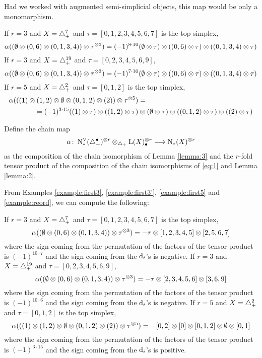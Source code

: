 \begin{remark}
	Had we worked with augmented semi-simplicial objects, this map would be only a monomorphism.
\end{remark}
\begin{example}\label{example:reord} If $r=3$ and $X=\triangle_{+}^7$ and $\tau = [0,1,2,3,4,5,6,7]$ is the top simplex,
\[
		\alpha((\emptyset \otimes  (0,6) \otimes  (0,1,3,4)) \otimes  \tau^{ \otimes  3}) = (-1)^{8\cdot 10}(\emptyset \otimes  \tau) \otimes  ((0,6) \otimes  \tau) \otimes  ((0,1,3,4) \otimes  \tau)
	\]
 If $r=3$ and $X=\triangle_{+}^{19}$ and $\tau = [0,2,3,4,5,6,9]$,
\[
		\alpha((\emptyset \otimes  (0,6) \otimes  (0,1,3,4)) \otimes  \tau^{ \otimes  3}) = (-1)^{7\cdot 10}(\emptyset \otimes  \tau) \otimes  ((0,6) \otimes  \tau) \otimes  ((0,1,3,4) \otimes  \tau)
	\]
 If $r=5$ and $X=\triangle_{+}^2$ and $\tau = [0,1,2]$ is the top simplex,
	\[
	\begin{split}
		\alpha(((1) \otimes  (1,2) \otimes  \emptyset \otimes  (0,1,2) \otimes  (2)) \otimes  \tau^{ \otimes  5}) &=
		\\
		=(-1)^{3\cdot 15}((1) \otimes  \tau)  \otimes  ((1,2) \otimes  \tau)& \otimes  (\emptyset \otimes  \tau) \otimes  ((0,1,2) \otimes  \tau) \otimes  ((2) \otimes  \tau)
		\end{split}
	\]
	\end{example}

\begin{definition} Define the chain map
	\[\alpha \colon  \operatorname{N}^\vee_{*}(\triangle_{+}^\bullet)^{ \otimes  r} \otimes _{\triangle_{+}} \operatorname{L}(X)_\bullet^{ \otimes  r}\longrightarrow \operatorname{N}_{*}(X)^{ \otimes  r}\]
as the composition of the chain isomorphism of Lemma \ref{lemma:3} and the $r$-fold tensor product of the composition of the chain isomorphisms of \eqref{eq:1} and Lemma \ref{lemma:2}.
\end{definition}


From Examples \ref{example:first3}, \ref{example:first3'}, \ref{example:first5} and \ref{example:reord}, we can compute the following:
\begin{example}\label{example:alpha} If $r=3$ and $X=\triangle_{+}^7$ and $\tau = [0,1,2,3,4,5,6,7]$ is the top simplex,
\[
		\alpha((\emptyset \otimes  (0,6) \otimes  (0,1,3,4)) \otimes  \tau^{ \otimes  3}) = -\tau \otimes  [1,2,3,4,5] \otimes  [2,5,6,7]
	\]
	where the sign coming from the permutation of the factors of the tensor product is $(-1)^{10\cdot 7}$ and the sign coming from the $\operatorname{d}_i$'s is negative. If $r=3$ and $X=\triangle_{+}^{19}$ and $\tau = [0,2,3,4,5,6,9]$,
\[
		\alpha((\emptyset \otimes  (0,6) \otimes  (0,1,3,4)) \otimes  \tau^{ \otimes  3}) = -\tau \otimes  [2,3,4,5,6] \otimes  [3,6,9]
	\]
	where the sign coming from the permutation of the factors of the tensor product is $(-1)^{10\cdot 6}$ and the sign coming from the $\operatorname{d}_i$'s is negative. If $r=5$ and $X=\triangle_{+}^2$ and $\tau = [0,1,2]$ is the top simplex,
	\[
		\alpha(((1) \otimes  (1,2) \otimes  \emptyset \otimes  (0,1,2) \otimes  (2)) \otimes  \tau^{ \otimes  5}) = -[0,2] \otimes  [0] \otimes  [0,1,2] \otimes  \emptyset \otimes  [0,1]
	\]
		where the sign coming from the permutation of the factors of the tensor product is $(-1)^{3\cdot 15}$ and the sign coming from the $\operatorname{d}_i$'s is positive.
	\end{example}

